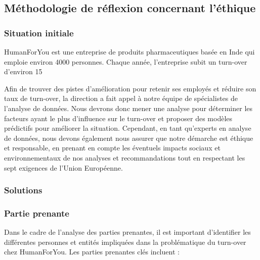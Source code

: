 \subsection{Méthodologie de réflexion concernant l'éthique}
\subsubsection{Situation initiale}
HumanForYou est une entreprise de produits pharmaceutiques basée en Inde qui emploie environ 4000 personnes. Chaque année, l'entreprise subit un turn-over d'environ 15%

Afin de trouver des pistes d'amélioration pour retenir ses employés et réduire son taux de turn-over, la direction a fait appel à notre équipe de spécialistes de l'analyse de données. Nous devrons donc mener une analyse pour déterminer les facteurs ayant le plus d'influence sur le turn-over et proposer des modèles prédictifs pour améliorer la situation. Cependant, en tant qu'experts en analyse de données, nous devons également nous assurer que notre démarche est éthique et responsable, en prenant en compte les éventuels impacts sociaux et environnementaux de nos analyses et recommandations tout en respectant les sept exigences de l'Union Européenne. 

\subsubsection{Solutions}

\newpage
\subsubsection{Partie prenante}
Dans le cadre de l'analyse des parties prenantes, il est important d'identifier les différentes personnes et entités impliquées dans la problématique du turn-over chez HumanForYou. Les parties prenantes clés incluent : 


